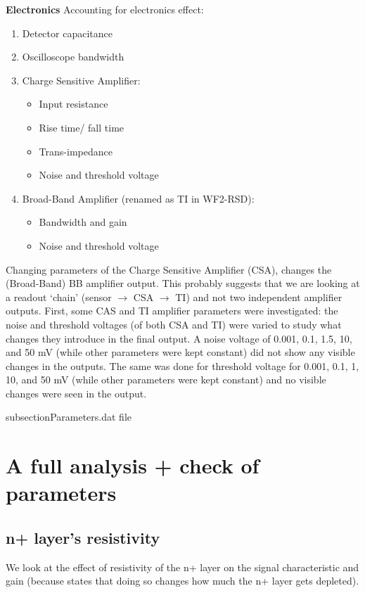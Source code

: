 \documentclass[11pt]{article}
\begin{document}
\newline
\textbf{Electronics}
Accounting for electronics effect:
\begin{enumerate}
    \item Detector capacitance
    \item Oscilloscope bandwidth
    \item Charge Sensitive Amplifier:
    \begin{itemize}
        \item Input resistance
        \item Rise time/ fall time
        \item Trans-impedance
        \item Noise and threshold voltage
    \end{itemize}
    \item Broad-Band Amplifier (renamed as TI in WF2-RSD):
    \begin{itemize}
        \item Bandwidth and gain
        \item Noise and threshold voltage
    \end{itemize}
\end{enumerate}
Changing parameters of the Charge Sensitive Amplifier (CSA), changes the (Broad-Band) BB amplifier output. This probably suggests that we are looking at a readout `chain' (sensor $\rightarrow$ CSA $\rightarrow$ TI) and not two independent amplifier outputs.
\newline
First, some CAS and TI amplifier parameters were investigated: the noise and threshold voltages (of both CSA and TI) were varied to study what changes they introduce in the final output. A noise voltage of 0.001, 0.1, 1.5, 10, and 50 mV (while other parameters were kept constant) did not show any visible changes in the outputs. The same was done for threshold voltage for 0.001, 0.1, 1, 10, and 50 mV (while other parameters were kept constant) and no visible changes were seen in the output.

subsection{Parameters.dat file}

\section{A full analysis + check of parameters}
\subsection{n+ layer's resistivity}
We look at the effect of resistivity of the n+ layer on the signal characteristic and gain (because \cite{giacomini-lgad} states that doing so changes how much the n+ layer gets depleted).
\end{document}
